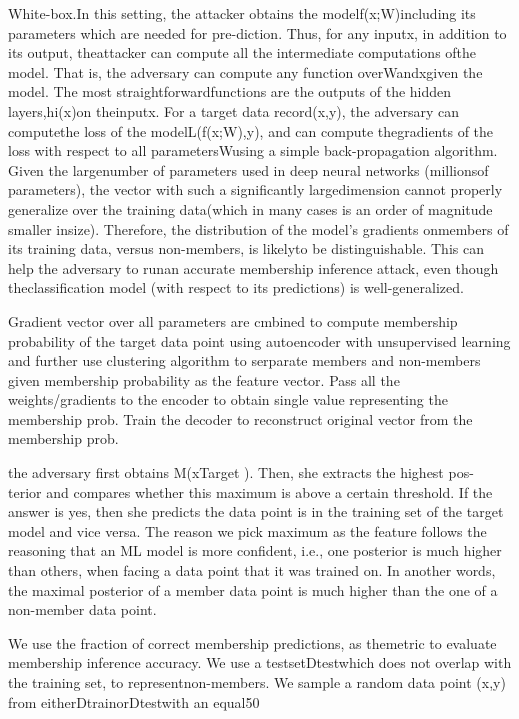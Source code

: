 White-box.In  this  setting,  the  attacker  obtains  the  modelf(x;W)including  its  parameters  which  are  needed  for  pre-diction.  Thus,  for  any  inputx,  in  addition  to  its  output,  theattacker  can  compute  all  the  intermediate  computations  ofthe  model.  That  is,  the  adversary  can  compute  any  function
overWandxgiven  the  model.  The  most  straightforwardfunctions  are  the  outputs  of  the  hidden  layers,hi(x)on  theinputx.
For  a target  data  record(x,y),  the adversary  can  computethe  loss  of  the  modelL(f(x;W),y),  and  can  compute  thegradients  of  the  loss  with  respect  to  all  parametersWusing  a  simple  back-propagation  algorithm.  Given  the  largenumber of parameters used in deep neural networks (millionsof  parameters),  the  vector  with  such  a  significantly  largedimension  cannot  properly  generalize  over  the  training  data(which  in  many  cases  is  an  order  of  magnitude  smaller  insize).  Therefore,  the  distribution  of  the  model’s  gradients  onmembers  of  its  training  data,  versus  non-members,  is  likelyto  be  distinguishable.  This  can  help  the  adversary  to  runan  accurate  membership  inference  attack,  even  though  theclassification  model  (with  respect  to  its  predictions)  is  well-generalized.

Gradient vector over all parameters are cmbined to compute membership probability of the target data point using autoencoder with unsupervised learning and further use clustering algorithm to serparate members and non-members given membership probability as the feature vector.
Pass all the weights/gradients to the encoder to obtain single value representing the membership prob. Train the decoder to reconstruct original vector from the membership prob.

the adversary first obtains M(xTarget ). Then, she extracts the highest pos- terior and compares whether this maximum is above a certain threshold. If the answer is yes, then she predicts the data point is in the training set of the target model and vice versa. The reason we pick maximum as the feature follows the reasoning that an ML model is more confident, i.e., one posterior is much higher than others, when facing a data point that it was trained on. In another words, the maximal posterior of a member data point is much higher than the one of a non-member data point.

We use the fraction of correct membership predictions, as themetric to evaluate membership inference accuracy. We use a testsetDtestwhich does not overlap with the training set, to representnon-members. We sample a random data point (x,y) from eitherDtrainorDtestwith an equal50%

